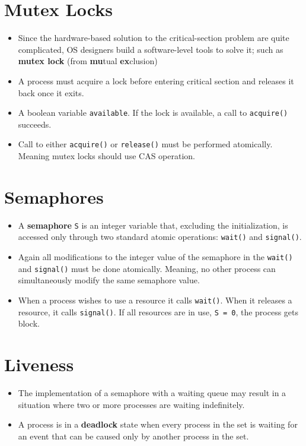 \documentclass{report}
\def\code#1{\texttt{#1}}
\begin{document}
\section{Mutex Locks}%

\begin{itemize}
  \item Since the hardware-based solution to the critical-section problem are quite complicated, OS designers
        build a software-level tools to solve it; such as \textbf{mutex lock} (from \textbf{mu}tual \textbf{ex}clusion)
  \item A process must acquire a lock before entering critical section and releases it back once it exits.
  \item A boolean variable \code{available}. If the lock is available, a call to \code{acquire()} succeeds.
  \item Call to either \code{acquire()} or \code{release()} must be performed atomically.
        Meaning mutex locks should use CAS operation.
\end{itemize}

\section{Semaphores}%
\begin{itemize}
  \item A \textbf{semaphore} \code{S} is an integer variable that, excluding the initialization, is accessed only through two
        standard atomic operations: \code{wait()} and \code{signal()}.
  \item Again all modifications to the integer value of the semaphore in the \code{wait()} and \code{signal()}
        must be done atomically. Meaning, no other process can simultaneously modify the same semaphore value.
  \item When a process wishes to use a resource it calls \code{wait()}. When it releases a resource, it calls
        \code{signal()}. If all resources are in use, \code{S = 0}, the process gets block.
\end{itemize}


\section{Liveness}%
\begin{itemize}
  \item The implementation of a semaphore with a waiting queue may result in a situation where two or more processes are
        waiting indefinitely.
  \item A process is in a \textbf{deadlock} state when every process in the set is waiting for an event that can be caused
        only by another process in the set.


\end{itemize}
\end{document}
